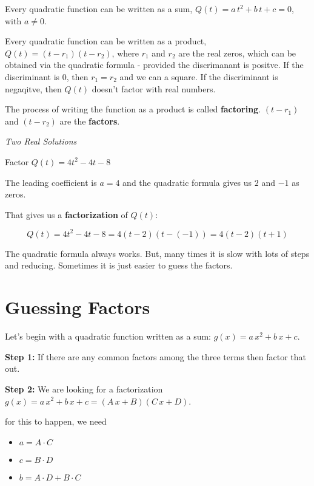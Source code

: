 \documentclass{ximera}
\begin{document}
Every quadratic function can be written as a sum, $Q(t) = a \, t^2 + b \, t + c = 0$, with $a \ne 0$.

Every quadratic function can be written as a product, $Q(t) = (t - r_1)(t - r_2)$, where $r_1$ and $r_2$ are the real zeros, which can be obtained via the quadratic formula - provided the discrimanant is positve.  If the discriminant is $0$, then $r_1 = r_2$ and we can a square.  If the discriminant is negaqitve, then $Q(t)$ doesn't factor with real numbers.  


The process of writing the function as a product is called \textbf{factoring}. $(t - r_1)$  and $(t - r_2)$ are the \textbf{factors}.



\begin{example} \textit{Two Real Solutions} 

Factor $Q(t) = 4 t^2 - 4 t - 8$ 

The leading coefficient is $a=4$ and the quadratic formula gives us $2$ and $-1$ as zeros.  

That gives us a \textbf{factorization} of $Q(t)$:



\[    Q(t) = 4 t^2 - 4 t - 8 =  4 (t-2)(t-(-1))    = 4 (t-2)(t+1)         \]



\end{example}



The quadratic formula always works.  But, many times it is slow with lots of steps and reducing.  Sometimes it is just easier to guess the factors.



\section{Guessing Factors}


Let's begin with a quadratic function written as a sum: $g(x) = a \, x^2 + b \, x + c$.  


\textbf{Step 1:} If there are any common factors among the three terms then factor that out.


\textbf{Step 2:} We are looking for a factorization $g(x) = a \, x^2 + b \, x + c = (A \, x + B)(C \, x + D)$.

for this to happen, we need

\begin{itemize}
\item $a = A \cdot C $
\item $c = B \cdot D$
\item $b = A\cdot D + B \cdot C$
\end{itemize}
\end{document}
